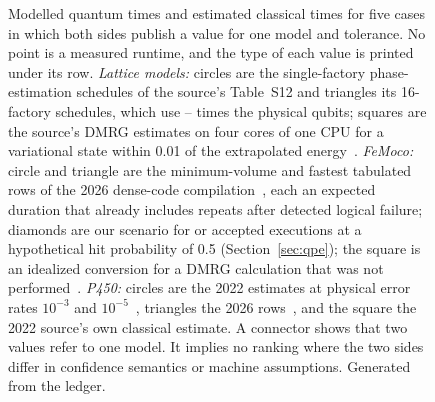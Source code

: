 \begin{figure}[htbp]
\caption[Modelled quantum and estimated classical times]{Modelled quantum times and estimated classical times for five cases in which both sides publish a value for one model and tolerance. No point is a measured runtime, and the type of each value is printed under its row. \emph{Lattice models:} circles are the single-factory phase-estimation schedules of the source's Table~S12 and triangles its 16-factory schedules, which use \parQubitLo--\parQubitHi{} times the physical qubits; squares are the source's DMRG estimates on four cores of one CPU for a variational state within 0.01 of the extrapolated energy~\cite{yoshioka2024}. \emph{FeMoco:} circle and triangle are the minimum-volume and fastest tabulated rows of the 2026 dense-code compilation~\cite{low2026dense}, each an expected duration that already includes repeats after detected logical failure; diamonds are our scenario for \repAttempts{} or \repAttemptsSplit{} accepted executions at a hypothetical hit probability of 0.5 (Section~\ref{sec:qpe}); the square is an idealized conversion for a DMRG calculation that was not performed~\cite{zhai2026}. \emph{P450:} circles are the 2022 estimates at physical error rates $10^{-3}$ and $10^{-5}$~\cite{goings2022}, triangles the 2026 rows~\cite{low2026dense}, and the square the 2022 source's own classical estimate. A connector shows that two values refer to one model. It implies no ranking where the two sides differ in confidence semantics or machine assumptions. Generated from the ledger.}
\label{fig:dumbbell}
\end{figure}
